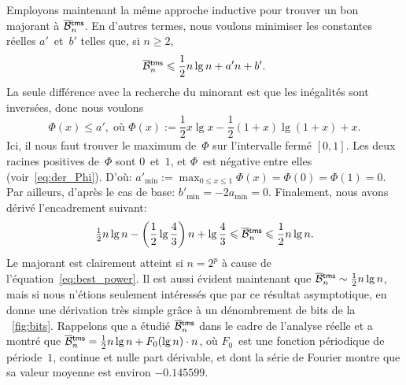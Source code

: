 Employons maintenant la même approche inductive pour trouver un bon
majorant à \(\OB{\fun{tms}}{n}\). En d'autres termes, nous voulons
minimiser les constantes réelles \(a'\)~et~\(b'\) telles que, si \(n
\geqslant 2\),
\begin{equation*}
\OB{\fun{tms}}{n} \leqslant \frac{1}{2}n\lg n + a'n + b'.
\end{equation*}
La seule différence avec la recherche du minorant est que les
inégalités sont inversées, donc nous voulons
\begin{equation*}
\Phi(x) \leqslant a', \;\text{où \(\Phi(x) := \frac{1}{2}x\lg x - \frac{1}{2}(1+x)\lg(1+x) + x\)}.
\end{equation*}
Ici, il nous faut trouver le maximum de~\(\Phi\) sur l'intervalle
fermé \([0,1]\). Les deux racines positives de~\(\Phi\) sont
\(0\)~et~\(1\), et \(\Phi\)~est négative entre elles
(voir~\eqref{eq:der_Phi}). D'où: \(a'_{\min} := \max_{0 \leqslant x
  \leqslant 1}\Phi(x) = \Phi(0) = \Phi(1) = 0\). Par ailleurs, d'après
le cas de base: \(b'_{\min} = -2a_{\min} = 0\). Finalement, nous
avons dérivé l'encadrement suivant:
\begin{equation}
  \tfrac{1}{2}n\lg n - \left(\frac{1}{2}\lg\frac{4}{3}\right)n +
  \lg\frac{4}{3} \leqslant \OB{\fun{tms}}{n} \leqslant
  \frac{1}{2}n\lg n.
\label{ineq:bounds_Btms}
\index{tms@$\OB{\fun{tms}}{n}$}
\end{equation}
Le majorant est clairement atteint si \(n=2^p\) à cause de
l'équation~\eqref{eq:best_power}. Il est aussi évident maintenant que
\(\OB{\fun{tms}}{n} \sim \frac{1}{2}n\lg n\), mais si nous n'étions
seulement intéressés que par ce résultat asymptotique,
\cite{Bush_1940} en donne une dérivation très simple grâce à un
dénombrement de bits de la \fig~\vref{fig:bits}. Rappelons que
\cite{Delange_1975} a étudié \(\OB{\fun{tms}}{n}\) dans le cadre de
l'analyse réelle et a montré que \(\OB{\fun{tms}}{n} =
\tfrac{1}{2}n\lg n + F_0(\lg n) \cdot n\), où \(F_0\)~est une fonction
périodique de période~\(1\), continue et nulle part dérivable, et dont
la série de Fourier montre que sa valeur moyenne est environ
\(-0.145599\).   


